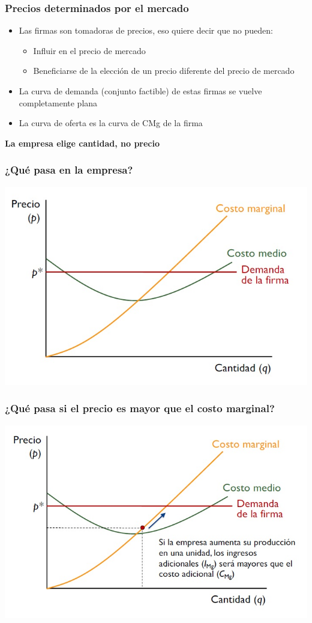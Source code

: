 \documentclass{beamer}
\begin{document}
\begin{frame}
\frametitle{ Precios determinados por el mercado}
\begin{itemize}
    \item Las firmas son tomadoras de precios, eso quiere decir que no pueden:
    \begin{itemize}
        \item Influir en el precio de mercado
        \item Beneficiarse de la elección de un precio diferente del precio de mercado
    \end{itemize}
    \item La curva de demanda (conjunto factible) de estas firmas se vuelve completamente plana
    \item La curva de oferta es la curva de CMg de la firma
    \end{itemize}
    \begin{center}
        \textbf{La empresa elige cantidad, no precio}
    \end{center}
\end{frame}

\begin{frame}
\frametitle{ ¿Qué pasa en la empresa?}
\includegraphics[scale=0.6]{Figures/Tema_07.7_compperfecta.jpg}
\end{frame}

\begin{frame}
\frametitle{ ¿Qué pasa si el precio es mayor que el costo marginal?}
\includegraphics[scale=0.55]{Figures/Tema_07.8_compperfecta2.jpg}
\end{frame}
\end{document}
